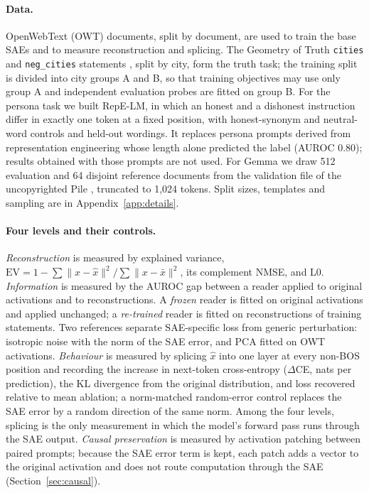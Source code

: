 \paragraph{Data.} OpenWebText (OWT) documents, split by document, are used to train the base SAEs and to measure
reconstruction and splicing. The Geometry of Truth \texttt{cities} and \texttt{neg\_cities} statements
\citep{marks2023geometry}, split by city, form the truth task; the training split is divided into city groups A and B,
so that training objectives may use only group A and independent evaluation probes are fitted on group B. For the
persona task we built RepE-LM, in which an honest and a dishonest instruction differ in exactly one token at a fixed
position, with honest-synonym and neutral-word controls and held-out wordings. It replaces persona prompts derived from
representation engineering \citep{zou2023representation} whose length alone predicted the label (AUROC 0.80); results
obtained with those prompts are not used. For Gemma we draw 512 evaluation and 64 disjoint reference documents from the
validation file of the uncopyrighted Pile \citep{gao2020pile}, truncated to 1{,}024 tokens. Split sizes, templates and
sampling are in Appendix~\ref{app:details}.

\paragraph{Four levels and their controls.}\label{sec:levels}
\emph{Reconstruction} is measured by explained variance, $\mathrm{EV}=1-\sum\|x-\hat{x}\|^2/\sum\|x-\bar{x}\|^2$, its
complement NMSE, and L0. \emph{Information} is measured by the AUROC gap between a reader applied to original
activations and to reconstructions. A \emph{frozen} reader is fitted on original activations and applied unchanged; a
\emph{re-trained} reader is fitted on reconstructions of training statements. Two references separate SAE-specific
loss from generic perturbation: isotropic noise with the norm of the SAE error, and PCA fitted on OWT activations.
\emph{Behaviour} is measured by splicing $\hat{x}$ into one layer at every non-BOS position and recording the increase
in next-token cross-entropy ($\Delta$CE, nats per prediction), the KL divergence from the original distribution, and
loss recovered relative to mean ablation; a norm-matched random-error control replaces the SAE error by a random
direction of the same norm. Among the four levels, splicing is the only measurement in which the model's forward pass
runs through the SAE output. \emph{Causal preservation} is measured by activation patching between paired prompts;
because the SAE error term is kept, each patch adds a vector to the original activation and does not route
computation through the SAE (Section~\ref{sec:causal}).

